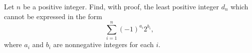 Let $n$ be a positive integer. Find, with proof, the least positive integer $d_{n}$ which cannot be expressed in the form \[\sum_{i=1}^{n}(-1)^{a_{i}}2^{b_{i}},\] where $a_{i}$ and $b_{i}$ are nonnegative integers for each $i$.